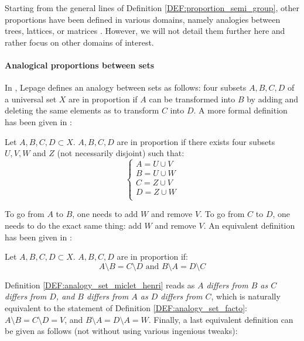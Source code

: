 Starting from the general lines of Definition \ref{DEF:proportion_semi_group},
other proportions have been defined in various domains, namely analogies
between trees, lattices, or matrices \cite{MicDel04, StrYvoREPORT05,
MicBayDelJAIR08}. However, we will not detail them further here and rather
focus on other domains of interest.

\paragraph{Analogical proportions between sets\\}

In \cite{Lep03}, Lepage defines an analogy between sets as follows: four subsets
$A, B, C, D$ of a universal set $X$ are in proportion if $A$ can be transformed
into $B$ by adding and deleting the same elements as to transform $C$ into $D$.
A more formal definition has been given in \cite{StrYvoREPORT05}:

\begin{definition}
  \label{DEF:analogy_set_facto}
  Let $A, B, C, D \subset X$. $A, B, C, D$ are in proportion if there exists
  four subsets $U, V, W$ and $Z$ (not necessarily disjoint) such that:
  $$
  \begin{cases}
    A = U \cup V\\
    B = U \cup W\\
    C = Z \cup V\\
    D = Z \cup W\\
  \end{cases}
  $$
\end{definition}

To go from $A$ to $B$, one needs to add $W$ and remove $V$. To go from $C$ to
$D$, one needs to do the exact same thing: add $W$ and remove $V$. An
equivalent definition has been given in \cite{MicPra09}:

\begin{definition}
  \label{DEF:analogy_set_miclet_henri}
  Let $A, B, C, D \subset X$. $A, B, C, D$ are in proportion if:
  $$
  A \setminus B = C \setminus D \text{ and } B \setminus A = D \setminus C
  $$
\end{definition}

Definition \ref{DEF:analogy_set_miclet_henri} reads as \textit{$A$ differs from
$B$ as $C$ differs from $D$, and $B$ differs from $A$ as $D$ differs from $C$},
which is naturally equivalent to the statement of Definition
\ref{DEF:analogy_set_facto}: $A \setminus B = C \setminus D = V$, and $B
\setminus A = D \setminus A  = W$.  Finally, a last equivalent definition can
be given as follows (not without using various ingenious tweaks):

